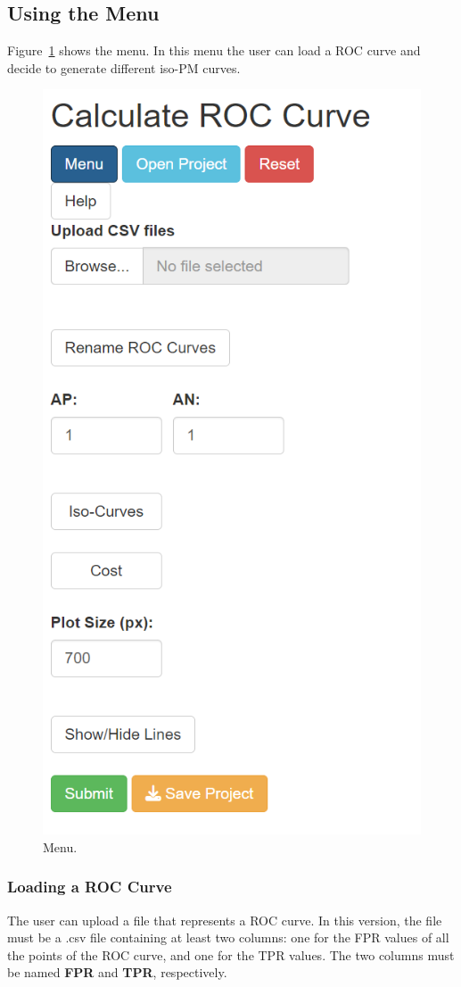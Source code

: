 \documentclass{article}
\begin{document}
	 \subsection{Using the Menu} \label{ssec:menus}
	 Figure~\ref{fig:screenMenu} shows the menu. In this menu the user can load a ROC curve and decide to generate different iso-PM curves.
	 
	 \begin{figure}[h!]
	 	\centering
	 	\caption{Menu.}
	 	\label{fig:screenMenu}
	 	\includegraphics[width=0.7\linewidth]{Figures/screenMenu.png}
	 \end{figure}
	 
	 \subsubsection{Loading a ROC Curve}
	 The user can upload a file that represents a ROC curve. In this version, the file must be a .csv file containing at least two columns: one for the FPR values of all the points of the ROC curve, and one for the TPR values. The two columns must be named \textbf{FPR} and \textbf{TPR}, respectively.
	 
\end{document}

